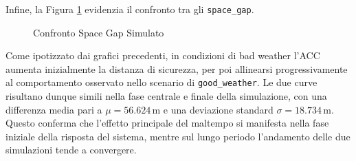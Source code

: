 \noindent Infine, la Figura \ref{fig:space_gap_bw} evidenzia il confronto tra gli \texttt{space\_gap}.
\begin{figure}[H]
    \centering
    \caption{Confronto Space Gap Simulato}
    \label{fig:space_gap_bw}
\end{figure}
\noindent Come ipotizzato dai grafici precedenti,
in condizioni di bad weather l'ACC aumenta inizialmente la distanza di sicurezza, per poi allinearsi progressivamente 
al comportamento osservato nello scenario di \texttt{good\_weather}. Le due curve risultano dunque simili nella fase centrale e 
finale della simulazione, con una differenza media pari a \(\mu = 56.624 \, \mathrm{m}\) e una deviazione 
standard \(\sigma = 18.734 \, \mathrm{m}\). Questo conferma che l'effetto principale del maltempo si manifesta 
nella fase iniziale della risposta del sistema, mentre sul lungo periodo l'andamento delle due simulazioni tende a convergere.